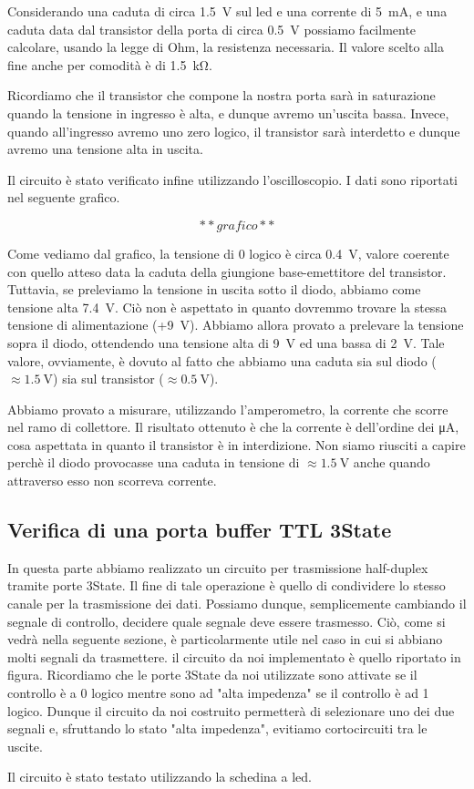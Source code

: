 Considerando una caduta di circa \SI{1.5}{\volt} sul led e una corrente di \SI{5}{\milli\ampere}, e una caduta data dal transistor della porta di circa \SI{0.5}{\volt} possiamo facilmente calcolare, usando la legge di Ohm, la resistenza necessaria. Il valore scelto alla fine anche per comodità è di \SI{1.5}{\kilo\ohm}.

Ricordiamo che il transistor che compone la nostra porta sarà in saturazione quando la tensione in ingresso è alta, e dunque avremo un'uscita bassa. Invece, quando all'ingresso avremo uno zero logico, il transistor sarà interdetto e dunque avremo una tensione alta in uscita. 

Il circuito è stato verificato infine utilizzando l'oscilloscopio. I dati sono riportati nel seguente grafico. 

$$**grafico**$$

Come vediamo dal grafico, la tensione di 0 logico è circa \SI{0.4}{\volt}, valore coerente con quello atteso data la caduta della giungione base-emettitore del transistor. Tuttavia, se preleviamo la tensione in uscita sotto il diodo, abbiamo come tensione alta \SI{7.4}{\volt}. Ciò non è aspettato in quanto dovremmo trovare la stessa tensione di alimentazione (+\SI{9}{\volt}). Abbiamo allora provato a prelevare la tensione sopra il diodo, ottendendo una tensione alta di \SI{9}{\volt} ed una bassa di \SI{2}{\volt}. Tale valore, ovviamente, è dovuto al fatto che abbiamo una caduta sia sul diodo ($\approx \SI{1.5}{\volt}$) sia sul transistor ($\approx \SI{0.5}{\volt}$). 

Abbiamo provato a misurare, utilizzando l'amperometro, la corrente che scorre nel ramo di collettore. Il risultato ottenuto è che la corrente è dell'ordine dei \si{\micro\ampere}, cosa aspettata  in quanto il transistor è in interdizione. Non siamo riusciti a capire perchè il diodo provocasse una caduta in tensione di $\approx \SI{1.5}{\volt}$ anche quando attraverso esso non scorreva corrente. 


\subsection{Verifica di una porta buffer TTL 3State}

In questa parte abbiamo realizzato un circuito per trasmissione half-duplex tramite porte 3State. Il fine di tale operazione è quello di condividere lo stesso canale per la trasmissione dei dati. Possiamo dunque, semplicemente cambiando il segnale di controllo, decidere quale segnale deve essere trasmesso. Ciò, come si vedrà nella seguente sezione, è particolarmente utile nel caso in cui si abbiano molti segnali da trasmettere. il circuito da noi implementato è quello riportato in figura. Ricordiamo che le porte 3State da noi utilizzate sono attivate se il controllo è a 0 logico mentre sono ad "alta impedenza" se il controllo è ad 1 logico. Dunque il circuito da noi costruito permetterà di selezionare uno dei due segnali e, sfruttando lo stato "alta impedenza", evitiamo cortocircuiti tra le uscite. 

Il circuito è stato testato utilizzando la schedina a led.